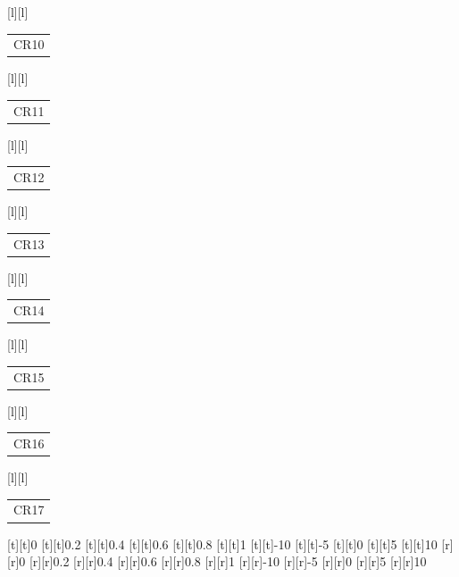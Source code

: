 \begin{psfrags}
[l][l]{\color[rgb]{0,0,0}\setlength{\tabcolsep}{0pt}\begin{tabular}{l}CR10\end{tabular}}%
[l][l]{\color[rgb]{0,0,0}\setlength{\tabcolsep}{0pt}\begin{tabular}{l}CR11\end{tabular}}%
[l][l]{\color[rgb]{0,0,0}\setlength{\tabcolsep}{0pt}\begin{tabular}{l}CR12\end{tabular}}%
[l][l]{\color[rgb]{0,0,0}\setlength{\tabcolsep}{0pt}\begin{tabular}{l}CR13\end{tabular}}%
[l][l]{\color[rgb]{0,0,0}\setlength{\tabcolsep}{0pt}\begin{tabular}{l}CR14\end{tabular}}%
[l][l]{\color[rgb]{0,0,0}\setlength{\tabcolsep}{0pt}\begin{tabular}{l}CR15\end{tabular}}%
[l][l]{\color[rgb]{0,0,0}\setlength{\tabcolsep}{0pt}\begin{tabular}{l}CR16\end{tabular}}%
[l][l]{\color[rgb]{0,0,0}\setlength{\tabcolsep}{0pt}\begin{tabular}{l}CR17\end{tabular}}%
%
[t][t]{0}%
[t][t]{0.2}%
[t][t]{0.4}%
[t][t]{0.6}%
[t][t]{0.8}%
[t][t]{1}%
[t][t]{-10}%
[t][t]{-5}%
[t][t]{0}%
[t][t]{5}%
[t][t]{10}%
%
[r][r]{0}%
[r][r]{0.2}%
[r][r]{0.4}%
[r][r]{0.6}%
[r][r]{0.8}%
[r][r]{1}%
[r][r]{-10}%
[r][r]{-5}%
[r][r]{0}%
[r][r]{5}%
[r][r]{10}%
%
%
\end{psfrags}%
%
